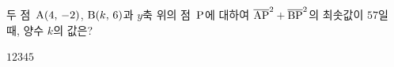두 점~$\mathrm{A}(4,\,-2)$, $\mathrm{B}(k,\,6)$과 $y$축 위의 점~$\mathrm{P}$에 대하여 $\overline{\mathrm{AP}}^2+\overline{\mathrm{BP}}^2$의 최솟값이 $57$일 때, 양수 $k$의 값은?
\begin{choices32}{$1$}{$2$}{$3$}{$4$}{$5$}\end{choices32}
